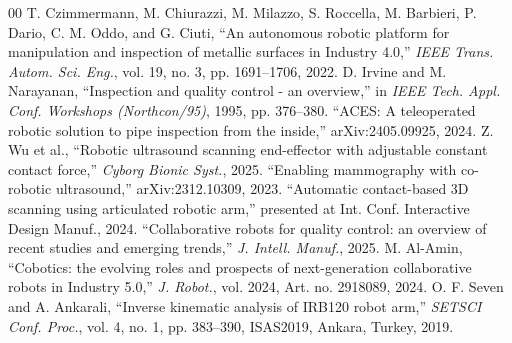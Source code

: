 \documentclass[conference]{IEEEtran}
\begin{document}
\begin{thebibliography}{00}
 T. Czimmermann, M. Chiurazzi, M. Milazzo, S. Roccella, M. Barbieri, P. Dario, C. M. Oddo, and G. Ciuti, ``An autonomous robotic platform for manipulation and inspection of metallic surfaces in Industry 4.0,'' \textit{IEEE Trans. Autom. Sci. Eng.}, vol. 19, no. 3, pp. 1691--1706, 2022.
 D. Irvine and M. Narayanan, ``Inspection and quality control - an overview,'' in \textit{IEEE Tech. Appl. Conf. Workshops (Northcon/95)}, 1995, pp. 376--380.
 ``ACES: A teleoperated robotic solution to pipe inspection from the inside,'' arXiv:2405.09925, 2024.
 Z. Wu et al., ``Robotic ultrasound scanning end-effector with adjustable constant contact force,'' \textit{Cyborg Bionic Syst.}, 2025.
 ``Enabling mammography with co-robotic ultrasound,'' arXiv:2312.10309, 2023.
 ``Automatic contact-based 3D scanning using articulated robotic arm,'' presented at Int. Conf. Interactive Design Manuf., 2024.
 ``Collaborative robots for quality control: an overview of recent studies and emerging trends,'' \textit{J. Intell. Manuf.}, 2025.
 M. Al-Amin, ``Cobotics: the evolving roles and prospects of next-generation collaborative robots in Industry 5.0,'' \textit{J. Robot.}, vol. 2024, Art. no. 2918089, 2024.
 O. F. Seven and A. Ankarali, ``Inverse kinematic analysis of IRB120 robot arm,'' \textit{SETSCI Conf. Proc.}, vol. 4, no. 1, pp. 383--390, ISAS2019, Ankara, Turkey, 2019.
\end{thebibliography}
\end{document}
